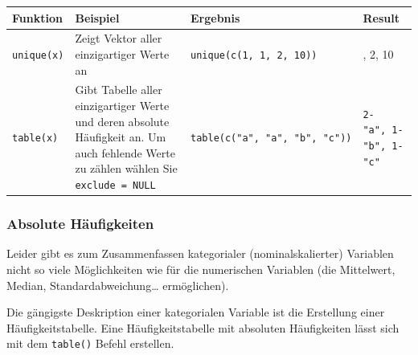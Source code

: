 \documentclass[
]{book}
\newenvironment{Shaded}{\begin{snugshade}}{\end{snugshade}}
\newcommand{\AttributeTok}[1]{\textcolor[rgb]{0.13,0.29,0.53}{#1}}
\newcommand{\FunctionTok}[1]{\textcolor[rgb]{0.13,0.29,0.53}{\textbf{#1}}}
\newcommand{\NormalTok}[1]{#1}
\newcommand{\OtherTok}[1]{\textcolor[rgb]{0.56,0.35,0.01}{#1}}
\newcommand{\SpecialCharTok}[1]{\textcolor[rgb]{0.81,0.36,0.00}{\textbf{#1}}}
\newcommand{\StringTok}[1]{\textcolor[rgb]{0.31,0.60,0.02}{#1}}
\newcounter{none} %
\begin{document}
{\def\LTcaptype{none} %
\begin{longtable}[]{@{}
  >{\raggedright\arraybackslash}p{}
  >{\raggedright\arraybackslash}p{}
  >{\raggedright\arraybackslash}p{}
  >{\raggedright\arraybackslash}p{}@{}}
\toprule\noalign{}
\begin{minipage}[b]{\linewidth}\raggedright
Funktion
\end{minipage} & \begin{minipage}[b]{\linewidth}\raggedright
Beispiel
\end{minipage} & \begin{minipage}[b]{\linewidth}\raggedright
Ergebnis
\end{minipage} & \begin{minipage}[b]{\linewidth}\raggedright
Result
\end{minipage} \\
\midrule\noalign{}
\endhead
\bottomrule\noalign{}
\endlastfoot
\texttt{unique(x)} & Zeigt Vektor aller einzigartiger Werte an & \texttt{unique(c(1,\ 1,\ 2,\ 10))} & 1, 2, 10 \\
\texttt{table(x)} & Gibt Tabelle aller einzigartiger Werte und deren absolute Häufigkeit an. Um auch fehlende Werte zu zählen wählen Sie \texttt{exclude\ =\ NULL} & \texttt{table(c("a",\ "a",\ "b",\ "c"))} & \texttt{2-"a",\ 1-"b",\ 1-"c"} \\
\end{longtable}
}

\subsubsection{Absolute Häufigkeiten}\label{absolute-huxe4ufigkeiten}

Leider gibt es zum Zusammenfassen kategorialer (nominalskalierter) Variablen nicht so viele Möglichkeiten wie für die numerischen Variablen (die Mittelwert, Median, Standardabweichung\ldots{} ermöglichen).

Die gängigste Deskription einer kategorialen Variable ist die Erstellung einer Häufigkeitstabelle. Eine Häufigkeitstabelle mit absoluten Häufigkeiten lässt sich mit dem \texttt{table()} Befehl erstellen.

\begin{Shaded}
\end{Shaded}
\end{document}
